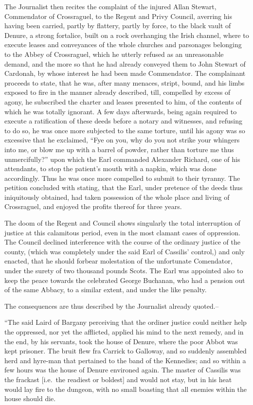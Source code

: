 The Journalist then recites the complaint of the injured Allan Stewart,
Commendator of Crossraguel, to the Regent and Privy Council, averring
his having been carried, partly by flattery, partly by force, to the
black vault of Denure, a strong fortalice, built on a rock overhanging
the Irish channel, where to execute leases and conveyances of the whole
churches and parsonages belonging to the Abbey of Crossraguel, which he
utterly refused as an unreasonable demand, and the more so that he had
already conveyed them to John Stewart of Cardonah, by whose interest he
had been made Commendator. The complainant proceeds to state, that he
was, after many menaces, stript, bound, and his limbs exposed to fire in
the manner already described, till, compelled by excess of agony, he
subscribed the charter and leases presented to him, of the contents of
which he was totally ignorant. A few days afterwards, being again
required to execute a ratification of these deeds before a notary and
witnesses, and refusing to do so, he was once more subjected to the same
torture, until his agony was so excessive that he exclaimed, ``Fye on
you, why do you not strike your whingers into me, or blow me up with a
barrel of powder, rather than torture me thus unmercifully?'' upon which
the Earl commanded Alexander Richard, one of his attendants, to stop the
patient's mouth with a napkin, which was done accordingly. Thus he was
once more compelled to submit to their tyranny. The petition concluded
with stating, that the Earl, under pretence of the deeds thus
iniquitously obtained, had taken possession of the whole place and
living of Crossraguel, and enjoyed the profits thereof for three years.

The doom of the Regent and Council shows singularly the total
interruption of justice at this calamitous period, even in the most
clamant cases of oppression. The Council declined interference with the
course of the ordinary justice of the county, (which was completely
under the said Earl of Cassilis' control,) and only enacted, that he
should forbear molestation of the unfortunate Comendator, under the
surety of two thousand pounds Scots. The Earl was appointed also to keep
the peace towards the celebrated George Buchanan, who had a pension out
of the same Abbacy, to a similar extent, and under the like penalty.

The consequences are thus described by the Journalist already quoted.--

``The said Laird of Bargany perceiving that the ordiner justice could
neither help the oppressed, nor yet the afflicted, applied his mind to
the next remedy, and in the end, by his servants, took the house of
Denure, where the poor Abbot was kept prisoner. The bruit flew fra
Carrick to Galloway, and so suddenly assembled herd and hyre-man that
pertained to the band of the Kennedies; and so within a few hours was
the house of Denure environed again. The master of Cassilis was the
frackast {[}i.e.~the readiest or boldest{]} and would not stay, but in
his heat would lay fire to the dungeon, with no small boasting that all
enemies within the house should die.

